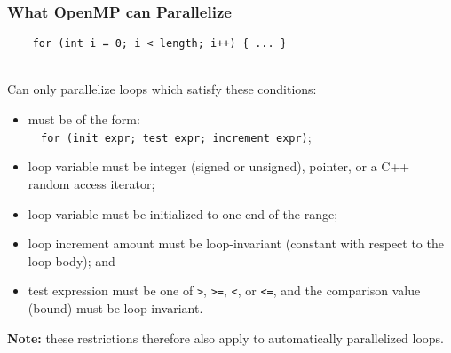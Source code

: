 \begin{frame}[fragile]
  \frametitle{What OpenMP can Parallelize}

  
\begin{verbatim}
    for (int i = 0; i < length; i++) { ... }
\end{verbatim}~\\[1em]

    Can only parallelize loops which satisfy these conditions:
\begin{itemize}
\item must be of the form:\\{\tt ~~for (init expr; test expr; increment expr)};
\item loop variable must be integer (signed or unsigned), pointer, or a C++
random access iterator;
\item loop variable must be initialized to one end of the range;
\item loop increment amount must be loop-invariant (constant with respect to the loop body); and
\item test expression must be one of {\tt >}, {\tt >=}, {\tt <}, or {\tt <=}, and the comparison value (bound) must be loop-invariant.
\end{itemize}

{\bf Note:} these restrictions therefore also apply to automatically parallelized
loops.
  

\end{frame}

